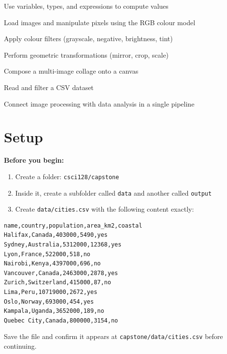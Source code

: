 \documentclass{cslab}
\begin{document}
\maketitle

\begin{objectives}
    \item Use variables, types, and expressions to compute values
    \item Load images and manipulate pixels using the RGB colour model
    \item Apply colour filters (grayscale, negative, brightness, tint)
    \item Perform geometric transformations (mirror, crop, scale)
    \item Compose a multi-image collage onto a canvas
    \item Read and filter a CSV dataset
    \item Connect image processing with data analysis in a single pipeline
\end{objectives}

\section{Setup}

\begin{setup}
\textbf{Before you begin:}
\begin{enumerate}
    \item Create a folder: \texttt{csci128/capstone}
    \item Inside it, create a subfolder called \texttt{data} and another called \texttt{output}
    \item Create \texttt{data/cities.csv} with the following content exactly:
\end{enumerate}

\begin{lstlisting}[language={},numbers=none,frame=single]
name,country,population,area_km2,coastal
Halifax,Canada,403000,5490,yes
Sydney,Australia,5312000,12368,yes
Lyon,France,522000,518,no
Nairobi,Kenya,4397000,696,no
Vancouver,Canada,2463000,2878,yes
Zurich,Switzerland,415000,87,no
Lima,Peru,10719000,2672,yes
Oslo,Norway,693000,454,yes
Kampala,Uganda,3652000,189,no
Quebec City,Canada,800000,3154,no
\end{lstlisting}

Save the file and confirm it appears at \texttt{capstone/data/cities.csv} before continuing.
\end{setup}
\end{document}
